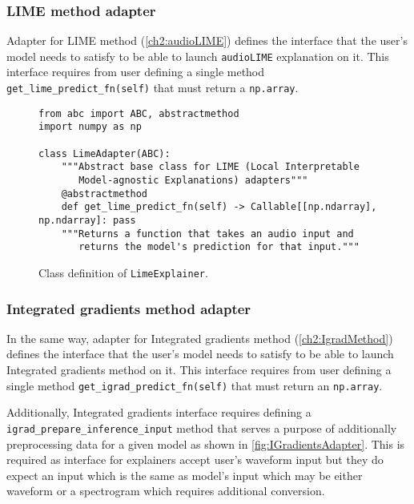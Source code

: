 \documentclass[
    bindingoffset=5mm,  %
    footnoteindent=3mm, %
    hyphenation=true    %
]{src/wut-thesis}
\begin{document}
\subsubsection{LIME method adapter}

    Adapter for LIME method (\ref{ch2:audioLIME}) defines the interface that the user's model needs to satisfy to be able to launch \texttt{audioLIME} explanation on it.
    This interface requires from user defining a single method \texttt{get_lime_predict_fn(self)}
    that must return a \texttt{np.array}.

\begin{figure}%
\begin{verbatim}
from abc import ABC, abstractmethod
import numpy as np

class LimeAdapter(ABC):
    """Abstract base class for LIME (Local Interpretable
       Model-agnostic Explanations) adapters"""
    @abstractmethod
    def get_lime_predict_fn(self) -> Callable[[np.ndarray], np.ndarray]: pass
    """Returns a function that takes an audio input and
       returns the model's prediction for that input."""
\end{verbatim}
\caption{Class definition of \texttt{LimeExplainer}.}
\label{fig:LimeAdapter}
\end{figure}

\subsubsection{Integrated gradients method adapter}

    In the same way, adapter for Integrated gradients method (\ref{ch2:IgradMethod}) defines the interface that the
    user's model needs to satisfy to be able to launch Integrated gradients method on it.
    This interface requires from user defining a single method \texttt{get_igrad_predict_fn(self)}
    that must return an \texttt{np.array}.

    Additionally, Integrated gradients interface requires defining a \texttt{igrad_prepare_inference_input}
    method that serves a purpose of additionally preprocessing data for a given model as shown in
    \ref{fig:IGradientsAdapter}. This is required as interface for explainers accept user's waveform input but they
    do expect an input which is the same as model's input which may be either waveform or a spectrogram which
    requires additional conversion.
\end{document}
